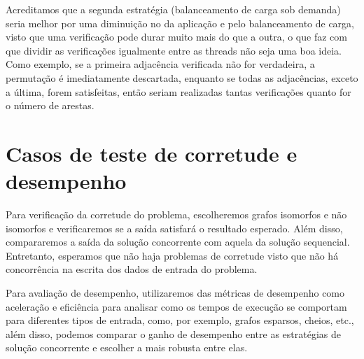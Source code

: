   Acreditamos que a segunda estratégia (balanceamento de carga sob demanda) seria melhor por uma diminuição no  da aplicação e pelo balanceamento de carga, visto que uma verificação pode durar muito mais do que a outra, o que faz com que dividir as verificações igualmente entre as threads não seja uma boa ideia. Como exemplo, se a primeira adjacência verificada não for verdadeira, a permutação é imediatamente descartada, enquanto se todas as adjacências, exceto a última, forem satisfeitas, então seriam realizadas tantas verificações quanto for o número de arestas.


\section{Casos de teste de corretude e desempenho}

  Para verificação da corretude do problema, escolheremos grafos isomorfos e não isomorfos e verificaremos se a saída satisfará o resultado esperado. Além disso, compararemos a saída da solução concorrente com aquela da solução sequencial. Entretanto, esperamos que não haja problemas de corretude visto que não há concorrência na escrita dos dados de entrada do problema.

  Para avaliação de desempenho, utilizaremos das métricas de desempenho como aceleração e eficiência para analisar como os tempos de execução se comportam para diferentes tipos de entrada, como, por exemplo, grafos esparsos, cheios, etc., além disso, podemos comparar o ganho de desempenho entre as estratégias de solução concorrente e escolher a mais robusta entre elas.
